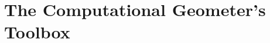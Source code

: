 \renewcommand{\parthook}{%
\AddToShipoutPictureBG*{%
\AtPageLowerLeft{\texttt{[image: figures/geometry]}}}%
\renewcommand{\parthook}{}}%
\part{The Computational Geometer's Toolbox}\label{sec:preliminaries}













